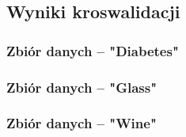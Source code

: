 \subsection{Wyniki kroswalidacji}

    \subsubsection{Zbiór danych -- "Diabetes"}
        
        


    \subsubsection{Zbiór danych -- "Glass"}
        
        


    \subsubsection{Zbiór danych -- "Wine"}
        
        
